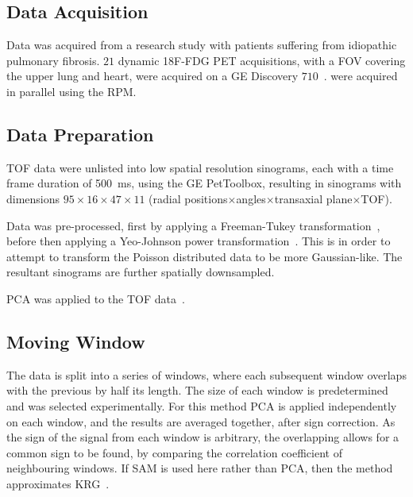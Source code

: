     \subsection{Data Acquisition} \label{sec:data_acquisition}
        Data was acquired from a research study with patients suffering from idiopathic pulmonary fibrosis. $21$ dynamic \acrshort{18F-FDG} \acrshort{PET} acquisitions, with a \acrlong{FOV} covering the upper lung and heart, were acquired on a \acrshort{GE} Discovery $710$~\cite{Oh2019OptimalTreatment, Emond2020EffectReconstruction}.  were acquired in parallel using the \gls{RPM}.
    
    \vspace{-0.5cm}
        
    \subsection{Data Preparation} \label{sec:data_preparation}
        \gls{TOF} data were unlisted into low spatial resolution sinograms, each with a time frame duration of \SI{500}{\milli\second}, using the \acrshort{GE} PetToolbox, resulting in sinograms with dimensions $95\times16\times47\times11$ (radial positions$\times$angles$\times$transaxial plane$\times$\gls{TOF}).
        
        Data was pre-processed, first by applying a Freeman-Tukey transformation~\cite{Freeman1950TransformationsRoot}, before then applying a Yeo-Johnson power transformation~\cite{Yeo2000ASymmetry}. This is in order to attempt to transform the Poisson distributed data to be more Gaussian-like. The resultant sinograms are further spatially downsampled.
        
        \acrshort{PCA} was applied to the \gls{TOF} data~\cite{Bertolli2017DataData}.
    
    \vspace{-0.5cm}
        
    \subsection{Moving Window} \label{sec:moving_window}
        The data is split into a series of windows, where each subsequent window overlaps with the previous by half its length. The size of each window is predetermined and was selected experimentally. For this method \acrshort{PCA} is applied independently on each window, and the results are averaged together, after sign correction. As the sign of the signal from each window is arbitrary, the overlapping allows for a common sign to be found, by comparing the correlation coefficient of neighbouring windows. If \gls{SAM} is used here rather than \acrshort{PCA}, then the method approximates \gls{KRG}~\cite{Schleyer2014}.
        
